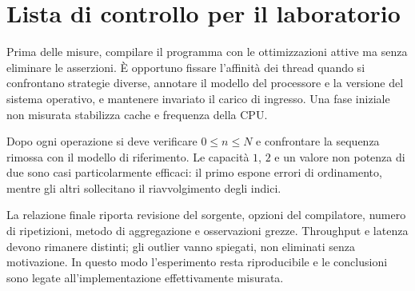 \documentclass[italian]{../../unipd-notes}
\begin{document}
\printcourselists

\courseappendices
\chapter{Lista di controllo per il laboratorio}

Prima delle misure, compilare il programma con le ottimizzazioni attive ma senza eliminare le asserzioni. È opportuno fissare l'affinità dei thread quando si confrontano strategie diverse, annotare il modello del processore e la versione del sistema operativo, e mantenere invariato il carico di ingresso. Una fase iniziale non misurata stabilizza cache e frequenza della CPU.

Dopo ogni operazione si deve verificare $0\leq n\leq N$ e confrontare la sequenza rimossa con il modello di riferimento. Le capacità $1$, $2$ e un valore non potenza di due sono casi particolarmente efficaci: il primo espone errori di ordinamento, mentre gli altri sollecitano il riavvolgimento degli indici.

La relazione finale riporta revisione del sorgente, opzioni del compilatore, numero di ripetizioni, metodo di aggregazione e osservazioni grezze. Throughput e latenza devono rimanere distinti; gli outlier vanno spiegati, non eliminati senza motivazione. In questo modo l'esperimento resta riproducibile e le conclusioni sono legate all'implementazione effettivamente misurata.
\end{document}

